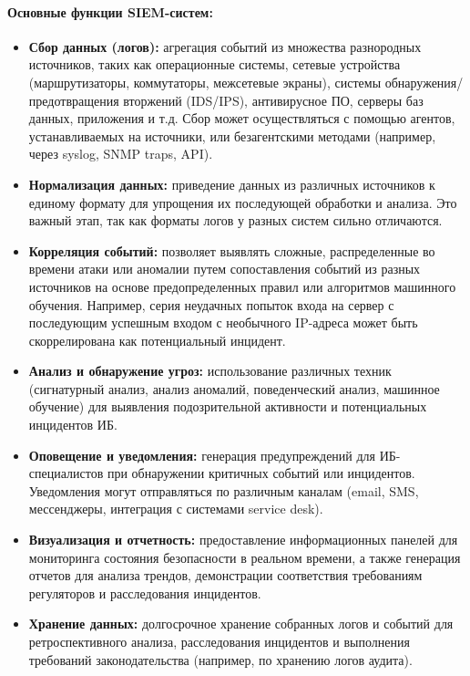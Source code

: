 \paragraph*{Основные функции SIEM-систем:}
\begin{itemize}
    \item \textbf{Сбор данных (логов):} агрегация событий из множества разнородных источников, таких как операционные системы, сетевые устройства (маршрутизаторы, коммутаторы, межсетевые экраны), системы обнаружения/предотвращения вторжений (IDS/IPS), антивирусное ПО, серверы баз данных, приложения и т.д. Сбор может осуществляться с помощью агентов, устанавливаемых на источники, или безагентскими методами (например, через syslog, SNMP traps, API).
    \item \textbf{Нормализация данных:} приведение данных из различных источников к единому формату для упрощения их последующей обработки и анализа. Это важный этап, так как форматы логов у разных систем сильно отличаются.
    \item \textbf{Корреляция событий:} позволяет выявлять сложные, распределенные во времени атаки или аномалии путем сопоставления событий из разных источников на основе предопределенных правил или алгоритмов машинного обучения. Например, серия неудачных попыток входа на сервер с последующим успешным входом с необычного IP-адреса может быть скоррелирована как потенциальный инцидент.
    \item \textbf{Анализ и обнаружение угроз:} использование различных техник (сигнатурный анализ, анализ аномалий, поведенческий анализ, машинное обучение) для выявления подозрительной активности и потенциальных инцидентов ИБ.
    \item \textbf{Оповещение и уведомления:} генерация предупреждений для ИБ-специалистов при обнаружении критичных событий или инцидентов. Уведомления могут отправляться по различным каналам (email, SMS, мессенджеры, интеграция с системами service desk).
    \item \textbf{Визуализация и отчетность:} предоставление информационных панелей	 для мониторинга состояния безопасности в реальном времени, а также генерация отчетов для анализа трендов, демонстрации соответствия требованиям регуляторов и расследования инцидентов.
    \item \textbf{Хранение данных:} долгосрочное хранение собранных логов и событий для ретроспективного анализа, расследования инцидентов и выполнения требований законодательства (например, по хранению логов аудита).
\end{itemize}

